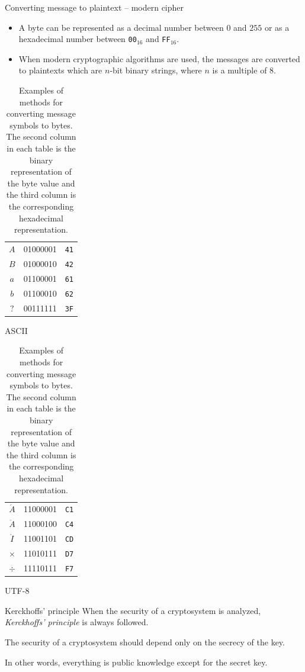 \begin{frame}{Converting message to plaintext -- modern cipher}
    \begin{itemize}
        \item A byte can be represented as a decimal number between $0$ and $255$ or as a hexadecimal number between \texttt{00}$_{16}$ and \texttt{FF}$_{16}$.
        \item When modern cryptographic algorithms are used, the messages are converted to plaintexts which are $n$-bit binary strings, where $n$ is a multiple of $8$.
\end{itemize}
\begin{table}
\begin{subtable}{0.45\textwidth}
\centering
    \begin{tabular}{|c|c|c|}\hline
               $A$  & 01000001 & \texttt{41}\\
               $B$  & 01000010 & \texttt{42}\\
               $a$  & 01100001 & \texttt{61}\\
               $b$  & 01100010 & \texttt{62}\\
               $?$  & 00111111 & \texttt{3F}\\\hline
    \end{tabular}\quad
    \caption{ASCII}
\end{subtable}
\begin{subtable}{0.45\textwidth}
\centering
    \begin{tabular}{|c|c|c|}\hline
               $\acute{A}$  & 11000001 & \texttt{C1}\\
               $\ddot{A}$  & 11000100 & \texttt{C4}\\
               $\acute{I}$  & 11001101& \texttt{CD}\\
               $\times$  & 11010111 & \texttt{D7}\\
               $\div$  & 11110111 & \texttt{F7}\\\hline
    \end{tabular}
    \caption{UTF-8}
\end{subtable}
\caption{Examples of methods for converting message symbols to bytes.
The second column in each table is the binary representation of the byte value and the third column is the corresponding hexadecimal representation.}
\end{table}
\end{frame}

\begin{frame}{Kerckhoffs' principle}
When the security of a cryptosystem is analyzed, \textit{Kerckhoffs' principle} is always followed.
\begin{definition}
The security of a cryptosystem should depend only on the secrecy of the key.
\end{definition}
\noindent
In other words, everything is public knowledge except for the secret key.
\end{frame}

